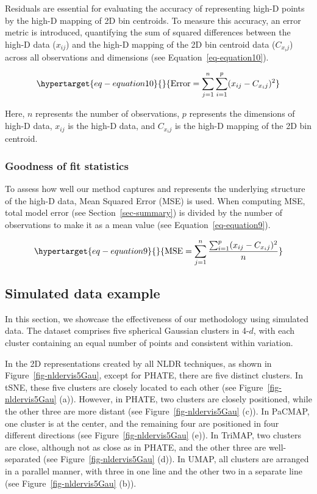 \documentclass[
  12pt]{article}
\begin{document}
Residuals are essential for evaluating the accuracy of representing
high-D points by the high-D mapping of 2D bin centroids. To measure this
accuracy, an error metric is introduced, quantifying the sum of squared
differences between the high-D data (\(x_{ij}\)) and the high-D mapping
of the 2D bin centroid data (\(C_{x_ij}\)) across all observations and
dimensions (see Equation~\ref{eq-equation10}).

\begin{equation}\protect\hypertarget{eq-equation10}{}{
\text{Error} = \sum_{j = 1}^{n}\sum_{i = 1}^{p} (x_{ij} - C_{x_ij})^2
}\label{eq-equation10}\end{equation}

Here, \(n\) represents the number of observations, \(p\) represents the
dimensions of high-D data, \(x_{ij}\) is the high-D data, and
\(C_{x_ij}\) is the high-D mapping of the 2D bin centroid.

\hypertarget{sec-goodfit}{%
\subsubsection{Goodness of fit statistics}\label{sec-goodfit}}

To assess how well our method captures and represents the underlying
structure of the high-D data, Mean Squared Error (MSE) is used. When
computing MSE, total model error (see Section~\ref{sec-summary}) is
divided by the number of observations to make it as a mean value (see
Equation~\ref{eq-equation9}).

\begin{equation}\protect\hypertarget{eq-equation9}{}{
\text{MSE} = \sum_{j = 1}^{n} \frac{\sum_{i = 1}^{p} (x_{ij} - C_{x_ij})^2}{n}
}\label{eq-equation9}\end{equation}

\hypertarget{sec-simpleex}{%
\subsection{Simulated data example}\label{sec-simpleex}}

In this section, we showcase the effectiveness of our methodology using
simulated data. The dataset comprises five spherical Gaussian clusters
in 4-\(d\), with each cluster containing an equal number of points and
consistent within variation.

In the 2D representations created by all NLDR techniques, as shown in
Figure~\ref{fig-nldervis5Gau}, except for PHATE, there are five distinct
clusters. In tSNE, these five clusters are closely located to each other
(see Figure~\ref{fig-nldervis5Gau} (a)). However, in PHATE, two clusters
are closely positioned, while the other three are more distant (see
Figure~\ref{fig-nldervis5Gau} (c)). In PaCMAP, one cluster is at the
center, and the remaining four are positioned in four different
directions (see Figure~\ref{fig-nldervis5Gau} (e)). In TriMAP, two
clusters are close, although not as close as in PHATE, and the other
three are well-separated (see Figure~\ref{fig-nldervis5Gau} (d)). In
UMAP, all clusters are arranged in a parallel manner, with three in one
line and the other two in a separate line (see
Figure~\ref{fig-nldervis5Gau} (b)).
\end{document}
